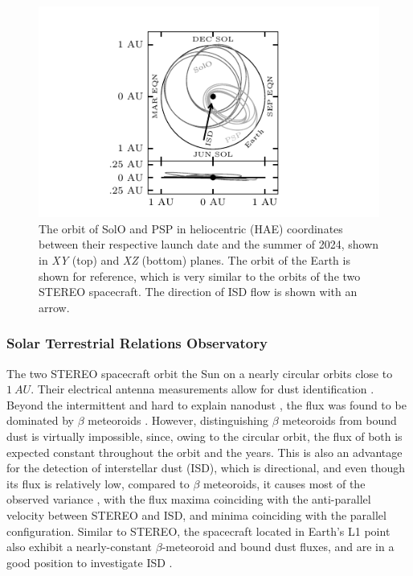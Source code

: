 \begin{figure}[h]
 	\centering
 	\includegraphics[width=13cm]{figures/solo_orbit.pdf}
 	\caption{The orbit of SolO and PSP in heliocentric (HAE) coordinates between their respective launch date and the summer of 2024, shown in \textit{XY} (top) and \textit{XZ} (bottom) planes. The orbit of the Earth is shown for reference, which is very similar to the orbits of the two STEREO spacecraft. The direction of ISD flow is shown with an arrow.}
 	\label{fig:sc_orbits}
\end{figure}

\subsubsection{Solar Terrestrial Relations Observatory}

The two STEREO spacecraft orbit the Sun on a nearly circular orbits close to $\SI{1}{AU}$. Their electrical antenna measurements allow for dust identification \citep{meyer2009dust}. Beyond the intermittent and hard to explain nanodust \citep{meyer2009dust}, the flux was found to be dominated by $\beta$ meteoroids \citep{zaslavsky2012interplanetary}. However, distinguishing $\beta$ meteoroids from bound dust is virtually impossible, since, owing to the circular orbit, the flux of both is expected constant throughout the orbit and the years. This is also an advantage for the detection of interstellar dust (ISD), which is directional, and even though its flux is relatively low, compared to $\beta$ meteoroids, it causes most of the observed variance \citep{zaslavsky2012interplanetary,malaspina2015revisiting,babic2022situ}, with the flux maxima coinciding with the anti-parallel velocity between STEREO and ISD, and minima coinciding with the parallel configuration. Similar to STEREO, the spacecraft located in Earth's L1 point also exhibit a nearly-constant $\beta$-meteoroid and bound dust fluxes, and are in a good position to investigate ISD \citep{malaspina2014interplanetary,malaspina2016database}.

